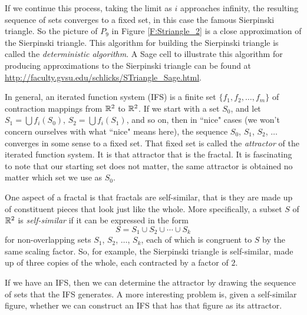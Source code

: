 If we continue this process, taking the limit as $i$ approaches infinity, the resulting sequence of sets converges to a fixed set, in this case the famous Sierpinski triangle. So the picture of $P_9$ in Figure \ref{F:Striangle_2} is a close approximation of the Sierpinski triangle. This algorithm for building the Sierpinski triangle is called the \emph{deterministic algorithm}.  A Sage cell to illustrate this algorithm for producing approximations to the Sierpinski triangle can be found at \url{http://faculty.gvsu.edu/schlicks/STriangle_Sage.html}.

In general, an iterated function system (IFS) is a finite set $\{f_1, f_2, \ldots, f_m\}$ of contraction mappings from $\mathbb{R}^2$ to $\mathbb{R}^2$. If we start with a set $S_0$, and let $S_1 = \bigcup f_i(S_0)$, $S_2 = \bigcup f_i(S_1)$, and so on, then in ``nice" cases (we won't concern ourselves with what ``nice" means here), the sequence $S_0$, $S_1$, $S_2$, $\ldots$ converges in some sense to a fixed set. That fixed set is called the  \emph{attractor} of the iterated function system. It is that attractor that is the fractal. It is fascinating to note that our starting set does not matter, the same attractor is obtained no matter which set we use as $S_0$.  

One aspect of a fractal is that fractals are self-similar, that is they are made up of constituent pieces that look just like the whole. More specifically, a subset $S$ of $\mathbb{R}^2$ is \emph{self-similar} if it can be expressed in the form 
\[S = S_1 \cup S_2 \cup \cdots \cup S_k\]
for non-overlapping sets $S_1$, $S_2$, $\ldots$, $S_k$, each of which is congruent to $S$ by the same scaling factor.  So, for example, the Sierpinski triangle is self-similar, made up of three copies of the whole, each contracted by a factor of $2$. 

If we have an IFS, then we can determine the attractor by drawing the sequence of sets that the IFS generates. A more interesting problem is, given a self-similar figure, whether we can construct an IFS that has that figure as its attractor. 

